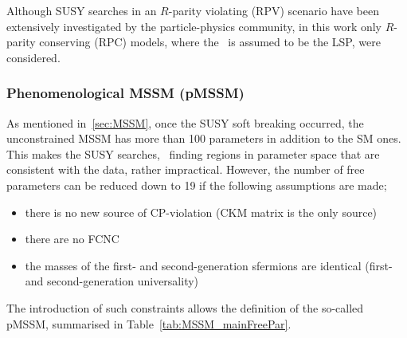 				Although \ac{SUSY} searches in an $R$-parity violating (RPV) scenario have been extensively investigated by the particle-physics community, in this work only $R$-parity conserving (RPC) models, where the \ninoone\ is assumed to be the \ac{LSP}, were considered.

			\subsubsection*{Phenomenological \ac{MSSM} (pMSSM)}

				As mentioned in~\ref{sec:MSSM}, once the \ac{SUSY} soft breaking occurred, the unconstrained \ac{MSSM} has more than 100 parameters in addition to the \ac{SM} ones. This makes the \ac{SUSY} searches, \eg\ finding regions in parameter space that are consistent with the data, rather impractical. However, the number of free parameters can be reduced down to 19 if the following  assumptions are made; 

				\begin{itemize}
					\item there is no new source of CP-violation (CKM matrix is the only source)
					\item there are no \ac{FCNC}
					\item the masses of the first- and second-generation sfermions are identical (first- and second-generation universality)
				\end{itemize}
				
				\noindent The introduction of such constraints allows the definition of the so-called \ac{pMSSM}, summarised in Table~\ref{tab:MSSM_mainFreePar}.
				
